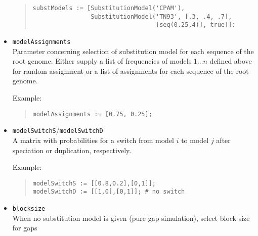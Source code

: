 \documentclass[11pt]{article}
\begin{document}
\begin{itemize}
\begin{quote}
\begin{verbatim}
substModels := [SubstitutionModel('CPAM'),
                SubstitutionModel('TN93', [.3, .4, .7],
                                  [seq(0.25,4)], true)]:
\end{verbatim}
\end{quote}
\item{\texttt{modelAssignments}} \hfill \\
Parameter concerning selection of substitution model for each sequence of the root genome. Either supply a list of frequencies of models $1\ldots n$ defined above for random assignment or a list of assignments for each sequence of the root genome.

Example:
\begin{quote}
\begin{verbatim}
modelAssignments := [0.75, 0.25];
\end{verbatim}
\end{quote}
\item{\texttt{modelSwitchS}/\texttt{modelSwitchD}} \hfill \\
A matrix with probabilities for a switch from model $i$ to model $j$ after speciation or duplication, respectively.

Example:
\begin{quote}
\begin{verbatim}
modelSwitchS := [[0.8,0.2],[0,1]];
modelSwitchD := [[1,0],[0,1]]; # no switch
\end{verbatim}
\end{quote}
\item{\texttt{blocksize}} \hfill \\
When no substitution model is given (pure gap simulation), select block size for gaps
\end{itemize}
\end{document}
